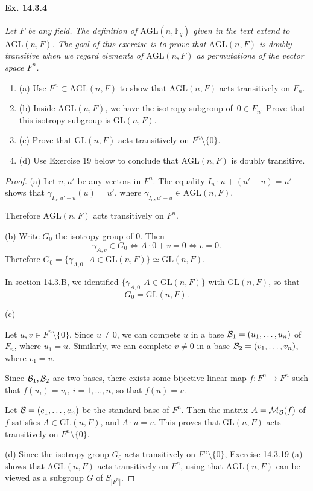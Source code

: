 \documentclass[11pt,a4paper]{article}
\newcommand{\be} {\begin{enumerate}}
\newcommand{\ee} {\end{enumerate}}
\newcommand{\F}{\mathbb{F}}
\begin{document}
\paragraph{Ex. 14.3.4}{\it Let $F$ be any field. The definition of $\mathrm{AGL}(n,\F_q)$ given in the text extend to $\mathrm{AGL}(n,F)$.
The goal of this exercise is to prove that $\mathrm{AGL}(n,F)$ is doubly transitive when we regard elements of $\mathrm{AGL}(n,F)$ as permutations of the vector space $F^n$.
\be
\item[(a)] Use $F^n \subset \mathrm{AGL}(n,F)$ to show that $\mathrm{AGL}(n,F)$ acts transitively on $F_n$.
\item[(b)] Inside $\mathrm{AGL}(n,F)$, we have the isotropy subgroup of $\,0\in F_n$. Prove that this isotropy subgroup is $\mathrm{GL}(n,F)$.
\item[(c)] Prove that $\mathrm{GL}(n,F)$ acts transitively on $F^n\setminus \{0\}$.
\item[(d)]Use Exercise 19 below to conclude that $\mathrm{AGL}(n,F)$ is doubly transitive.
\ee
}
\begin{proof}
\item[(a)] Let $u,u'$ be any vectors in $F^n$. The equality $I_n\cdot u  + (u'- u) = u'$ shows that $\gamma_{I_n,u'-u}(u) = u'$, where $\gamma_{I_n,u'-u} \in \mathrm{AGL}(n,F)$.

Therefore $\mathrm{AGL}(n,F)$ acts transitively on $F^n$.

\item[(b)] Write $G_0$ the isotropy group of $0$. Then
$$\gamma_{A,v} \in G_0 \iff A\cdot 0 + v = 0 \iff v = 0.$$
Therefore $G_0 = \{\gamma_{A,0}\, | \,  A \in \mathrm{GL}(n,F)\} \simeq \mathrm{GL}(n,F)$.

In section 14.3.B, we identified $\{\gamma_{A,0}\, \ A \in \mathrm{GL}(n,F)\} $ with $\mathrm{GL}(n,F)$, so that
$$G_0 = \mathrm{GL}(n,F).$$

\item[(c)]

 Let $u,v \in F^n \setminus \{0\}$. Since $u \ne 0$, we can compete $u$ in a base ${\cal B} _1= (u_1,\ldots,u_n)$ of $F_n$, where $u_1 = u$. Similarly, we can complete $v\ne 0$ in a base ${\cal B}_2 = (v_1,\ldots,v_n)$, where $v_1 = v$. 

Since ${\cal B}_1,{\cal B}_2$ are two bases, there exists some bijective linear map $f : F^n \to F^n$ such that $f(u_i) = v_i,\ i=1,\ldots,n$, so that $f(u) = v$.

Let ${\cal B} = (e_1,\ldots,e_n)$ be the standard base of $F^n$. Then the matrix $A = {\cal M}_{\cal B}(f)$ of $f$ satisfies $A \in \mathrm{GL}(n,F)$, and $A \cdot u = v$. This proves that $\mathrm{GL}(n,F)$ acts transitively on $F^n \setminus\{0\}$.

\item[(d)] Since  the isotropy group $G_0$ acts transitively on $F^n\setminus \{0\}$, Exercise 14.3.19 (a) shows that $\mathrm{AGL}(n,F)$ acts transitively on $F^n$, using that  $\mathrm{AGL}(n,F)$ can be viewed as a subgroup $G$ of $S_{|F^n|}$.
\end{proof} 
 
\end{document}
